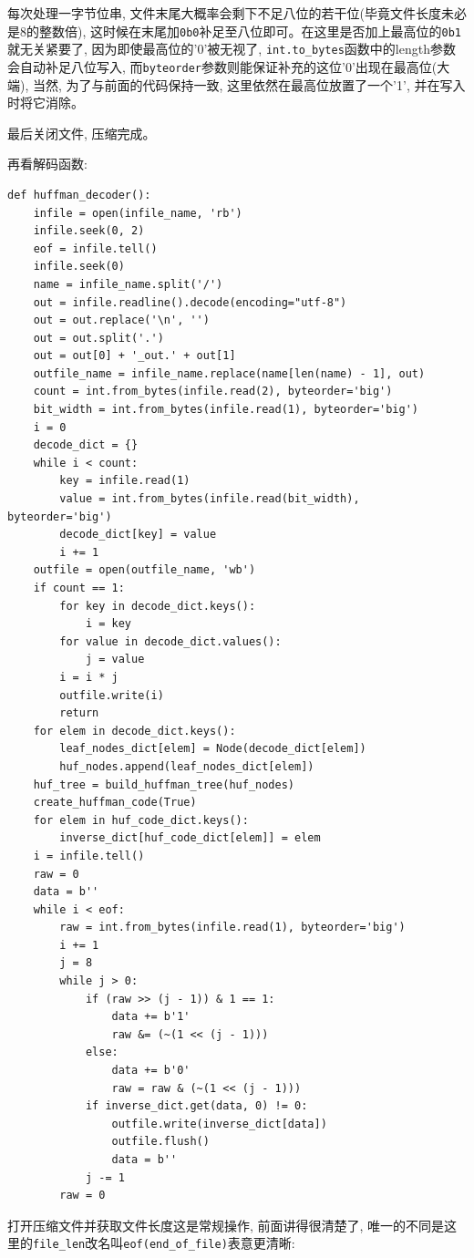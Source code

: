 \documentclass{ctexart}
\begin{document}
每次处理一字节位串, 文件末尾大概率会剩下不足八位的若干位(毕竟文件长度未必是8的整数倍), 这时候在末尾加\texttt{0b0}补足至八位即可。在这里是否加上最高位的\texttt{0b1}就无关紧要了, 因为即使最高位的'0'被无视了, \texttt{int.to\_bytes}函数中的length参数会自动补足八位写入, 而\texttt{byteorder}参数则能保证补充的这位'0'出现在最高位(大端), 当然, 为了与前面的代码保持一致, 这里依然在最高位放置了一个'1', 并在写入时将它消除。

最后关闭文件, 压缩完成。

再看解码函数:

{\setmainfont{Courier New Bold}              
\begin{lstlisting}
def huffman_decoder():
    infile = open(infile_name, 'rb')
    infile.seek(0, 2)
    eof = infile.tell()
    infile.seek(0)
    name = infile_name.split('/')
    out = infile.readline().decode(encoding="utf-8")
    out = out.replace('\n', '')
    out = out.split('.')
    out = out[0] + '_out.' + out[1]
    outfile_name = infile_name.replace(name[len(name) - 1], out)
    count = int.from_bytes(infile.read(2), byteorder='big')
    bit_width = int.from_bytes(infile.read(1), byteorder='big')
    i = 0
    decode_dict = {}
    while i < count:
        key = infile.read(1)
        value = int.from_bytes(infile.read(bit_width), byteorder='big')
        decode_dict[key] = value
        i += 1
    outfile = open(outfile_name, 'wb')
    if count == 1:
        for key in decode_dict.keys():
            i = key
        for value in decode_dict.values():
            j = value
        i = i * j
        outfile.write(i)
        return
    for elem in decode_dict.keys():
        leaf_nodes_dict[elem] = Node(decode_dict[elem])
        huf_nodes.append(leaf_nodes_dict[elem])
    huf_tree = build_huffman_tree(huf_nodes)
    create_huffman_code(True)
    for elem in huf_code_dict.keys():
        inverse_dict[huf_code_dict[elem]] = elem
    i = infile.tell()
    raw = 0
    data = b''
    while i < eof:
        raw = int.from_bytes(infile.read(1), byteorder='big')
        i += 1
        j = 8
        while j > 0:
            if (raw >> (j - 1)) & 1 == 1:
                data += b'1'
                raw &= (~(1 << (j - 1)))
            else:
                data += b'0'
                raw = raw & (~(1 << (j - 1)))
            if inverse_dict.get(data, 0) != 0:
                outfile.write(inverse_dict[data])
                outfile.flush()
                data = b''
            j -= 1
        raw = 0
\end{lstlisting}}

打开压缩文件并获取文件长度这是常规操作, 前面讲得很清楚了, 唯一的不同是这里的\texttt{file\_len}改名叫\texttt{eof(end\_of\_file)}表意更清晰:
\end{document}
